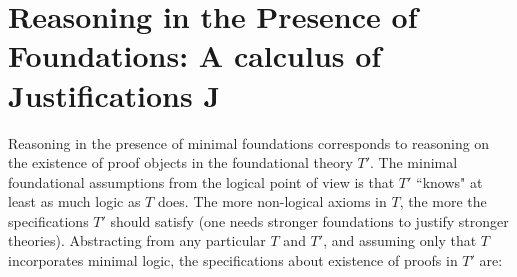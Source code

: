 




\begin{mathpar}
\end{mathpar}

\section{Reasoning in the Presence of Foundations: A calculus of Justifications {\sf J}}\label{sec:J}

Reasoning in the presence of minimal foundations corresponds  to reasoning on the existence of  proof objects in the foundational theory  $T'$. The minimal foundational assumptions from the logical point of view is that $T'$ ``knows" at least as much logic as $T$ does. 
The more non-logical axioms in $T$, the more the specifications $T'$ should satisfy (one needs stronger foundations to justify stronger theories). Abstracting from any particular $T$ and $T'$, and assuming only that $T$ incorporates minimal logic, the  specifications 
about existence of proofs in  $T'$ are:

